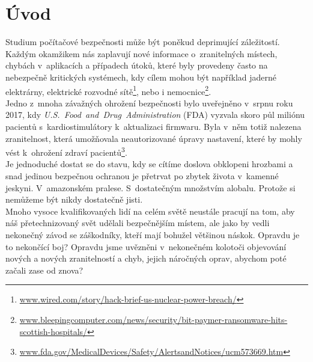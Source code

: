 
\chapter{Úvod}\label{ch:introduction}
Studium počítačové bezpečnosti může být poněkud deprimující záležitostí. Každým okamžikem nás zaplavují nové informace o~zranitelných místech, 
chybách v~aplikacích a případech útoků, které byly provedeny často na nebezpečně kritických systémech, kdy cílem mohou být například jaderné 
elektrárny, elektrické rozvodné sítě\footnote{\url{www.wired.com/story/hack-brief-us-nuclear-power-breach/}}, nebo i 
nemocnice\footnote{\url{www.bleepingcomputer.com/news/security/bit-paymer-ransomware-hits-scottish-hospitals/}}.\\

Jedno z~mnoha závažných ohrožení bezpečnosti bylo uveřejněno v~srpnu roku 2017, kdy \mbox{\textit{U.S. Food and Drug Administration}} (FDA) vyzvala 
skoro půl miliónu pacientů s~kardiostimulátory k~aktualizaci firmwaru. Byla v~něm totiž nalezena zranitelnost, která umožňovala neautorizované úpravy 
nastavení, které by mohly vést k~ohrožení zdraví pacientů\footnote{\url{www.fda.gov/MedicalDevices/Safety/AlertsandNotices/ucm573669.htm}}. \\

Je jednoduché dostat se do stavu, kdy se cítíme doslova obklopeni hrozbami a snad jedinou bezpečnou ochranou je přetrvat po zbytek života 
v~kamenné jeskyni. V~amazonském pralese. S~dostatečným množstvím alobalu. Protože si nemůžeme být nikdy dostatečně jisti. \\

Mnoho vysoce kvalifikovaných lidí na celém světě neustále pracují na tom, aby náš přetechnizovaný svět udělali bezpečnějším místem, ale jako by vedli 
nekonečný závod se záškodníky, kteří mají bohužel většinou náskok. Opravdu je to nekončící boj? Opravdu jsme uvězněni v~nekonečném kolotoči objevování 
nových a nových zranitelností a chyb, jejich náročných oprav, abychom poté začali zase od znova? \\

